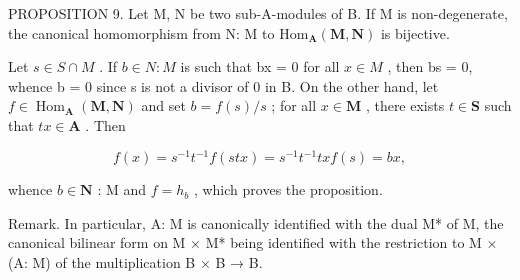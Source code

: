 PROPOSITION 9. Let M, N be two sub-A-modules of B. If M is non-degenerate, the canonical homomorphism from N: M to \(\mathrm{Hom}_{\mathbf{A}}(\mathbf{M},\mathbf{N})\) is bijective.

Let \(s \in S \cap M\) . If \(b \in N: M\) is such that bx = 0 for all \(x \in M\) , then bs = 0, whence b = 0 since s is not a divisor of 0 in B. On the other hand, let \(f \in \operatorname{Hom}_{\mathbf{A}}(\mathbf{M}, \mathbf{N})\) and set \(b = f(s) / s\) ; for all \(x \in \mathbf{M}\) , there exists \(t \in \mathbf{S}\) such that \(tx \in \mathbf{A}\) . Then

\[
f (x) = s ^ {- 1} t ^ {- 1} f (s t x) = s ^ {- 1} t ^ {- 1} t x f (s) = b x,
\]

whence \(b \in \mathbf{N}\) : M and \(f = h_b\) , which proves the proposition.

Remark. In particular, A: M is canonically identified with the dual M* of M, the canonical bilinear form on M × M* being identified with the restriction to M × (A: M) of the multiplication B × B → B.

